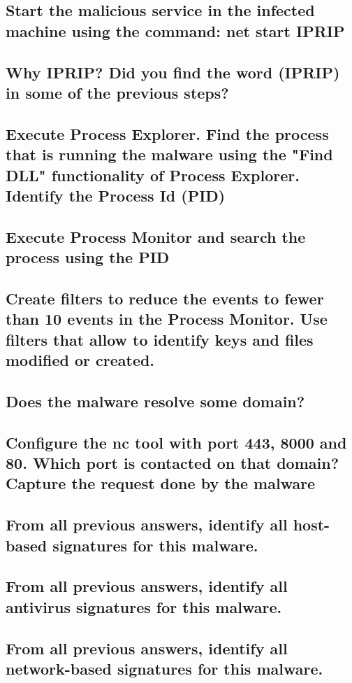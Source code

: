 \documentclass[12pt,letter]{article} %
\begin{document}
        \subsection{Start the malicious service in the infected machine using
        the command: net start IPRIP}

        \subsection{Why IPRIP? Did you find the word (IPRIP) in some of the
        previous steps?}

        \subsection{Execute Process Explorer. Find the process that is running
        the malware using the "Find DLL" functionality of Process Explorer.
        Identify the Process Id (PID)}

        \subsection{Execute Process Monitor and search the process using the PID}

        \subsection{Create filters to reduce the events to fewer than 10 events
        in the Process Monitor. Use filters that allow to identify keys and
        files modified or created.}

        \subsection{Does the malware resolve some domain? }

        \subsection{Configure the nc tool with port 443, 8000 and 80. Which
        port is contacted on that domain? Capture the request done by the
        malware}

        \subsection{From all previous answers, identify all host-based
        signatures for this malware.}

        \subsection{From all previous answers, identify all antivirus
        signatures for this malware. }

        \subsection{From all previous answers, identify all network-based
        signatures for this malware.}
\end{document}
